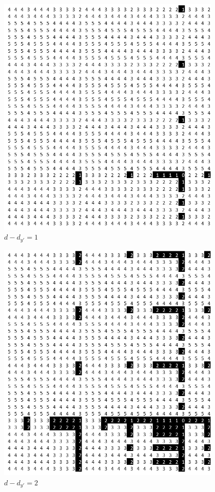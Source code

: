 \documentclass[oneside,12pt]{DISCSthesis}
\begin{document}
{\begin{figure}[h]
				\begin{minipage}{.33\textwidth} \centering \includegraphics[width=0.95\textwidth]{img/1} $d-d_{y'} = 1$ \end{minipage}%
				\begin{minipage}{.33\textwidth} \centering \includegraphics[width=0.95\textwidth]{img/2} $d-d_{y'} = 2$ \end{minipage}

\end{figure}}
\end{document}
